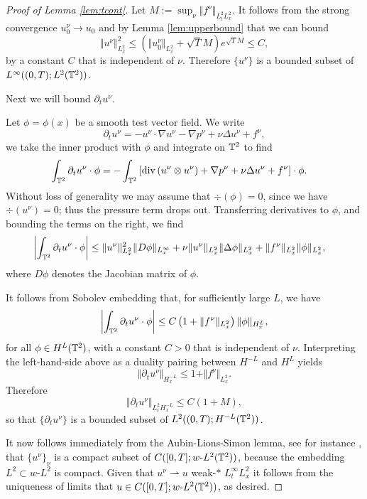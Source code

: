 \documentclass[reqno,12pt]{amsart}
\begin{document}
\begin{proof}[Proof of Lemma \ref{lem:tcont}]

Let $M:= \sup_{\nu} \Vert f^\nu \Vert_{L^2_t L^2_x}$. It follows from the strong convergence $u^\nu_0 \to u_0$ and by Lemma \ref{lem:upperbound} that we can bound
\[
\Vert u^\nu \Vert_{L^2_x}^2 \le \left(\Vert u^\nu_0 \Vert_{L^2_x} + \sqrt{T} M \right) e^{\sqrt{T} M} \le C,
\]
by a constant $C$ that is independent of $\nu$. Therefore $\{u^\nu \}$ is a bounded subset of $L^\infty((0,T);L^2(\mathbb{T}^2))$.

Next we will bound $\partial_t u^\nu$.

Let $\phi = \phi(x)$ be a smooth test vector field. We write
\[
\partial_t u^\nu = -u^\nu \cdot \nabla u^\nu - \nabla p^\nu + \nu \Delta u^\nu + f^\nu,
\]
we take the inner product with $\phi$ and integrate on $\mathbb{T}^2$ to find
\begin{align*}
\int_{\mathbb{T}^2} \partial_t u^\nu \cdot \phi
&=
-\int_{\mathbb{T}^2} \left[ {\mathrm{div}} \left( u^\nu \otimes u^\nu \right) + \nabla p^\nu + \nu \Delta u^\nu + f^\nu \right] \cdot \phi.
\end{align*}
Without loss of generality we may assume that $\div (\phi) = 0$, since we have $\div(u^\nu)=0$; thus the pressure term drops out. Transferring derivatives to $\phi$, and bounding the terms on the right, we find
\begin{align*}
\left|\int_{\mathbb{T}^2} \partial_t u^\nu \cdot \phi \right|
&\le
\Vert u^\nu \Vert_{L^2_x}^2 \Vert D \phi \Vert_{L^\infty_x}
+ \nu \Vert u^\nu \Vert_{L^2_x} \Vert \Delta \phi \Vert_{L^2_x} + \Vert f^\nu \Vert_{L^2_x} \Vert \phi \Vert_{L^2_x},
\end{align*}
where $D\phi$ denotes the Jacobian matrix of $\phi$.



 It follows from Sobolev embedding that, for sufficiently large $L$, we have
\[
\left|\int_{\mathbb{T}^2} \partial_t u^\nu \cdot \phi \right|
\le
C\left( 1 + \Vert f^\nu \Vert_{L^2_x} \right) \Vert \phi \Vert_{H^{L}_x},
\]
for all $\phi \in H^L(\mathbb{T}^2)$, with a constant $C>0$ that is independent of $\nu$. Interpreting the left-hand-side above as a duality pairing between $H^{-L}$ and $H^L$ yields
\[\Vert \partial_t u^\nu \Vert_{H^{-L}_x} \leq 1 + \Vert f^\nu \Vert_{L^2_x} .\]
Therefore
\begin{equation} \label{visctderest}
\Vert \partial_t u^\nu \Vert_{L^2_tH^{-L}_x} \leq C(1+M),
\end{equation}
so that $\{\partial_t u^\nu \}$ is a bounded subset of $L^2((0,T);H^{-L}(\mathbb{T}^2))$.

It now follows immediately from the Aubin-Lions-Simon lemma, see for instance \cite[Theorem II.5.16]{BoyerFabrie2013}, that $\{u^\nu\}_\nu$ is a compact subset of $C([0,T]; w\text{-}L^2(\mathbb{T}^2))$, because the embedding $L^2 \subset w\text{-}L^2$ is compact. Given that $u^\nu \rightharpoonup u$ weak-$\ast$ $L^\infty_tL^2_x$ it follows from the uniqueness of limits that $ u \in C([0,T]; w\text{-}L^2(\mathbb{T}^2))$, as desired.

\end{proof}
\end{document}
